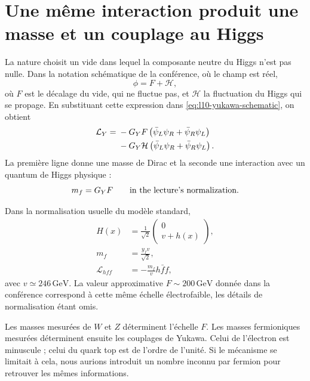 \section{Une même interaction produit une masse et un couplage au Higgs}

La nature choisit un vide dans lequel la composante neutre du Higgs n’est pas nulle. Dans la notation schématique de la conférence, où le champ est réel, \begin{equation}
  \phi=F+\mathcal H ,
  \label{eq:l10-f-plus-h}
\end{equation}où \(F\) est le décalage du vide, qui ne fluctue pas, et \(\mathcal H\) la fluctuation du Higgs qui se propage. En substituant cette expression dans \eqref{eq:l10-yukawa-schematic}, on obtient \begin{align}
  \mathcal L_Y
  ={}&
  -G_YF
  \left(\bar\psi_L\psi_R+\bar\psi_R\psi_L\right)
  \notag\\
  &-G_Y\mathcal H
  \left(\bar\psi_L\psi_R+\bar\psi_R\psi_L\right).
  \label{eq:l10-yukawa-split}
\end{align}La première ligne donne une masse de Dirac et la seconde une interaction avec un quantum de Higgs physique : \begin{equation}
  m_f=G_YF
  \qquad\hbox{in the lecture's normalization.}
  \label{eq:l10-mass-lecture-normalization}
\end{equation}

Dans la normalisation usuelle du modèle standard, \begin{equation}
\begin{aligned}
  H(x)&=\frac{1}{\sqrt2}
  \begin{pmatrix}
    0\\ v+h(x)
  \end{pmatrix},
  \\
  m_f&=\frac{y_fv}{\sqrt2},
  \\
  \mathcal L_{hff}&=-\frac{m_f}{v}h\bar f f,
\end{aligned}
  \label{eq:l10-standard-higgs-normalization}
\end{equation}avec \(v\simeq246\,\mathrm{GeV}\). La valeur approximative \(F\sim200\,\mathrm{GeV}\) donnée dans la conférence correspond à cette même échelle électrofaible, les détails de normalisation étant omis.

Les masses mesurées de \(W\) et \(Z\) déterminent l’échelle \(F\). Les masses fermioniques mesurées déterminent ensuite les couplages de Yukawa. Celui de l’électron est minuscule ; celui du quark top est de l’ordre de l’unité. Si le mécanisme se limitait à cela, nous aurions introduit un nombre inconnu par fermion pour retrouver les mêmes informations.

